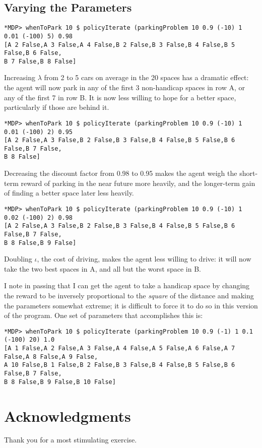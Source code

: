 \documentclass[paper=letter,pagesize=automedia,twoside=false,12pt]{scrartcl}
\theoremstyle{plain}%
\theoremstyle{definition}
\theoremstyle{remark}
\begin{document}
\subsection{Varying the Parameters}

\begin{verbatim}
*MDP> whenToPark 10 $ policyIterate (parkingProblem 10 0.9 (-10) 1 0.01 (-100) 5) 0.98
[A 2 False,A 3 False,A 4 False,B 2 False,B 3 False,B 4 False,B 5 False,B 6 False,
B 7 False,B 8 False]
\end{verbatim}

Increasing \(\lambda\) from 2 to 5 cars on average in the 20 spaces has a dramatic effect: the agent will now park in any of the first 3 non-handicap spaces in row A, or any of the first 7 in row B.  It is now less willing to hope for a better space, particularly if those are behind it.

\begin{verbatim}
*MDP> whenToPark 10 $ policyIterate (parkingProblem 10 0.9 (-10) 1 0.01 (-100) 2) 0.95
[A 2 False,A 3 False,B 2 False,B 3 False,B 4 False,B 5 False,B 6 False,B 7 False,
B 8 False]
\end{verbatim}

Decreasing the discount factor from 0.98 to 0.95 makes the agent weigh the short-term reward of parking in the near future more heavily, and the longer-term gain of finding a better space later less heavily.

\begin{verbatim}
*MDP> whenToPark 10 $ policyIterate (parkingProblem 10 0.9 (-10) 1 0.02 (-100) 2) 0.98
[A 2 False,A 3 False,B 2 False,B 3 False,B 4 False,B 5 False,B 6 False,B 7 False,
B 8 False,B 9 False]
\end{verbatim}

Doubling \(\iota\), the cost of driving, makes the agent less willing to drive: it will now take the two best spaces in A, and all but the worst space in B.

I note in passing that I can get the agent to take a handicap space by changing the reward to be inversely proportional to the \textit{square} of the distance and making the parameters somewhat extreme; it is difficult to force it to do so in this version of the program.  One set of parameters that accomplishes this is:

\begin{verbatim}
*MDP> whenToPark 10 $ policyIterate (parkingProblem 10 0.9 (-1) 1 0.1 (-100) 20) 1.0
[A 1 False,A 2 False,A 3 False,A 4 False,A 5 False,A 6 False,A 7 False,A 8 False,A 9 False,
A 10 False,B 1 False,B 2 False,B 3 False,B 4 False,B 5 False,B 6 False,B 7 False,
B 8 False,B 9 False,B 10 False]
\end{verbatim}

\section{Acknowledgments}

Thank you for a most stimulating exercise.
\end{document}
